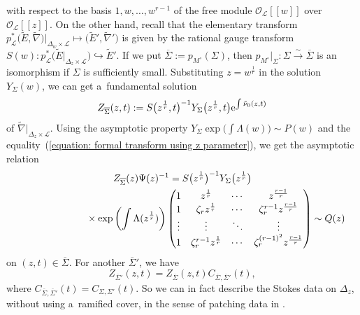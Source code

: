 \documentclass[pdftex]{sigma}
\numberwithin{equation}{section}
\begin{document}
with respect to the basis
$1,w,\dots,w^{r-1}$
of the free module
$ {\mathcal O}_{\mathcal L}[[w]]$
over $ {\mathcal O}_{\mathcal L}[[z]]$.
On the other hand,
recall that the elementary transform
$p_{\mathcal L}^*\big(\tilde{E},\tilde{\nabla}\big)|_{\Delta_w\times{\mathcal L}}
\mapsto \big(\tilde{E}',\tilde{\nabla}'\big)$
is given by the rational gauge transform
$S(w)\colon p_{\mathcal L}^*\big(\tilde{E}|_{\Delta_z\times {\mathcal L}}\big)
\hookrightarrow \tilde{E}'$.
If we put
$\overline{\Sigma}:=p_{M^{\circ}}(\Sigma)$, then
$p_{M^{\circ}}|_{\Sigma}\colon \Sigma \stackrel{\sim}\longrightarrow
\overline{\Sigma}$
is an isomorphism if $\Sigma$ is sufficiently small.
Substituting $z=w^{\frac{1}{r}}$ in the solution
$Y_{\Sigma}(w)$,
we can get a~fundamental solution
\[
 Z_{\overline{\Sigma}}(z,t):=S\big(z^{\frac{1}{r}},t\big)^{-1}Y_{\Sigma}\big(z^{\frac{1}{r}},t\big) {\rm e}^{\int\tilde{\nu}_0(z,t)}
\]
of $\tilde{\nabla}|_{\Delta_z\times{\mathcal L}}$.
Using the asymptotic property
$Y_{\Sigma}\exp\big( \int\Lambda(w) \big)\sim P(w)$
and the equality~(\ref{equation: formal transform using z parameter}),
we get the asymptotic relation
\begin{gather}
 Z_{\overline{\Sigma}}(z) \Psi(z)^{-1}
 =
 S\big(z^{\frac{1}{r}}\big)^{-1}Y_{\Sigma}\big(z^{\frac{1}{r}}\big)\nonumber\\
 \hphantom{ Z_{\overline{\Sigma}}(z) \Psi(z)^{-1}=}{}
 \times
 \exp\left( \int\Lambda(z^{\frac{1}{r}}) \right)
 \begin{pmatrix}
 1 & z^{\frac{1}{r}} & \cdots & z^{\frac{r-1}{r}} \\
 1 & \zeta_r z^{\frac{1}{r}} & \cdots & \zeta_r^{r-1} z^{\frac{r-1}{r}} \\
 \vdots & \vdots & \ddots & \vdots \\
 1 & \zeta_r^{r-1} z^{\frac{1}{r}} & \cdots & \zeta_r^{(r-1)^2} z^{\frac{r-1}{r}}
 \end{pmatrix}
 \sim Q(z)\label{equation: asymptotic solution on z-space}
\end{gather}
on $(z,t)\in \overline{\Sigma}$.
For another $\overline{\Sigma}'$, we have
\[
 Z_{\overline{\Sigma}'}(z,t)=Z_{\overline{\Sigma}}(z,t)C_{\overline{\Sigma},\overline{\Sigma}'}(t),
\]
where $C_{\overline{\Sigma},\overline{\Sigma}'}(t)=C_{\Sigma,\Sigma'}(t)$.
So we can in fact describe the Stokes data on
$\Delta_z$, without using a~ramified cover,
in the sense of patching data in \cite[Theorem 4.5.1]{Babbitt-Varadarajan}.
\end{document}
